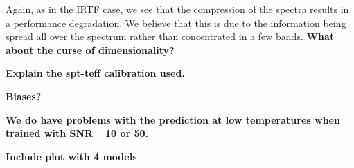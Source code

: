 Again, as in the IRTF case, we see that the compression of the spectra
results in a performance degradation. We believe that this is due to
the information being spread all over the spectrum rather than
concentrated in a few bands. {\bf What about the curse of
  dimensionality? }




{\bf Explain the spt-teff calibration used.}

{\bf Biases?}

{\bf We do have problems with the prediction at low temperatures when
trained with SNR= 10 or 50.}

{\bf Include plot with 4 models}

